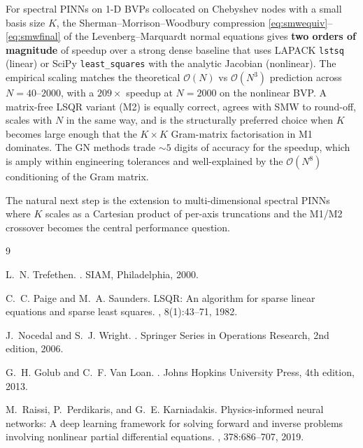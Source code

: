 \documentclass[11pt,a4paper]{article}
\newcommand{\Order}{\mathcal{O}}
\begin{document}
For spectral PINNs on 1-D BVPs collocated on Chebyshev nodes with a small
basis size $K$, the Sherman--Morrison--Woodbury compression
\eqref{eq:smwequiv}--\eqref{eq:smwfinal} of the Levenberg--Marquardt normal
equations gives \textbf{two orders of magnitude} of speedup over a strong dense
baseline that uses LAPACK \texttt{lstsq} (linear) or SciPy \texttt{least\_squares}
with the analytic Jacobian (nonlinear). The empirical scaling matches the
theoretical $\Order(N)$ vs $\Order(N^{3})$ prediction across $N=40$--$2000$, with
a $209\times$ speedup at $N=2000$ on the nonlinear BVP. A matrix-free LSQR
variant (M2) is equally correct, agrees with SMW to round-off, scales with $N$
in the same way, and is the structurally preferred choice when $K$ becomes
large enough that the $K\times K$ Gram-matrix factorisation in M1 dominates.
The GN methods trade $\sim 5$ digits of accuracy for the speedup, which is
amply within engineering tolerances and well-explained by the
$\Order(N^{8})$ conditioning of the Gram matrix.

The natural next step is the extension to multi-dimensional spectral PINNs
where $K$ scales as a Cartesian product of per-axis truncations and the M1/M2
crossover becomes the central performance question.

\begin{thebibliography}{9}

L.~N. Trefethen.
.
\newblock SIAM, Philadelphia, 2000.

C.~C. Paige and M.~A. Saunders.
\newblock LSQR: An algorithm for sparse linear equations and sparse least squares.
, 8(1):43--71, 1982.

J.~Nocedal and S.~J. Wright.
.
\newblock Springer Series in Operations Research, 2nd edition, 2006.

G.~H. Golub and C.~F. Van Loan.
.
\newblock Johns Hopkins University Press, 4th edition, 2013.

M.~Raissi, P.~Perdikaris, and G.~E. Karniadakis.
\newblock Physics-informed neural networks: A deep learning framework for
  solving forward and inverse problems involving nonlinear partial differential
  equations.
, 378:686--707, 2019.

\end{thebibliography}
\end{document}
